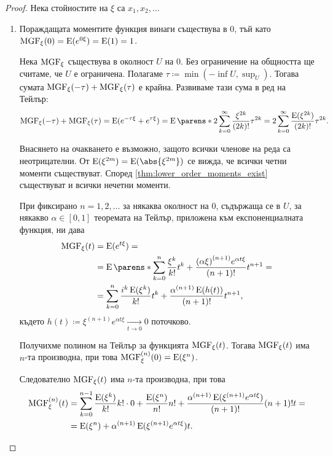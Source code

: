 \documentclass{../../common/topic}
\begin{document}
\begin{proof}
  Нека стойностите на \( \xi \) са \( x_1, x_2, \ldots \)

  \hfill
  \begin{enumerate}
    \item Пораждащата моментите функция винаги съществува в \( 0 \), тъй като \( \operatorname{MGF}_\xi(0) = \operatorname{E}(e^{0\xi}) = \operatorname{E}(1) = 1 \).

    Нека \( \operatorname{MGF}_\xi \) съществува в околност \( U \) на \( 0 \). Без ограничение на общността ще считаме, че \( U \) е ограничена. Полагаме \( \tau \coloneqq \min(-\inf U, \sup_U) \). Тогава сумата \( \operatorname{MGF}_\xi(-\tau) + \operatorname{MGF}_\xi(\tau) \) е крайна. Развиваме тази сума в ред на Тейлър:
    \begin{equation*}
      \MGF_\xi(-\tau) + \MGF_\xi(\tau)
      =
      \Expect(e^{-\tau\xi} + e^{\tau\xi})
      =
      \Expect\parens*{ 2 \sum_{k=0}^\infty \frac {\xi^{2k}} {(2k)!} \tau^{2k} }
      =
      2 \sum_{k=0}^\infty \frac {\Expect(\xi^{2k})} {(2k)!} \tau^{2k}.
    \end{equation*}

    Внасянето на очакването е възможно, защото всички членове на реда са неотрицателни. От \( \Expect(\xi^{2m}) = \Expect(\abs{\xi^{2m}}) \) се вижда, че всички четни моменти съществуват. Според \cref{thm:lower_order_moments_exist} съществуват и всички нечетни моменти.

    При фиксирано \( n = 1, 2, \ldots \) за някаква околност на \( 0 \), съдържаща се в \( U \), за някакво \( \alpha \in [0, 1] \) теоремата на Тейлър, приложена към експоненциалната функция, ни дава
    \begin{align*}
      \MGF_\xi(t)
      &=
      \Expect(e^{t\xi})
      = \\ &=
      \Expect\parens*{\sum_{k=0}^n \frac {\xi^k} {k!} t^k + \frac {{(\alpha \xi)}^{(n+1)} e^{\alpha t \xi}} {(n+1)!} t^{n+1} }
      = \\ &=
      \sum_{k=0}^n \frac {i^k \Expect(\xi^k)} {k!} t^k + \frac {{\alpha}^{(n+1)} \Expect(h(t))} {(n+1)!} t^{n+1},
    \end{align*}
    където \( h(t) \coloneqq \xi^{(n+1)} e^{\alpha t \xi} \xrightarrow[t \to 0]{} 0 \) поточково.

    Получихме полином на Тейлър за функцията \( \operatorname{MGF}_\xi(t) \). Тогава \( \operatorname{MGF}_\xi(t) \) има \( n \)-та производна, при това \( \operatorname{MGF}^{(n)}_\xi(0) = \operatorname{E}(\xi^n) \).

    Следователно \( \operatorname{MGF}_\xi(t) \) има \( n \)-та производна, при това
    \begin{align*}
      \operatorname{MGF}^{(n)}_\xi(t)
      &=
      \sum_{k=0}^{n-1} \frac {\operatorname{E}(\xi^k)} {k!} k! \cdot 0 + \frac {\operatorname{E}(\xi^n)} {n!} n! + \frac {\alpha^{(n+1)} \operatorname{E}(\xi^{(n+1)} e^{\alpha t \xi})} {(n+1)!} (n+1)! t
      = \\ &=
      \operatorname{E}(\xi^n) + \alpha^{(n+1)} \operatorname{E}(\xi^{(n+1)} e^{\alpha t \xi}) t.
    \end{align*}


\end{enumerate}
\end{proof}
\end{document}
